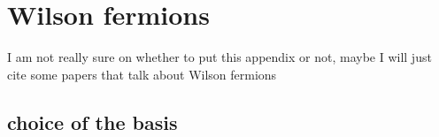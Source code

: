 \chapter{Wilson fermions}
\label{chap:AppendixB}
I am not really sure on whether to put this appendix or not, maybe I will just cite some papers that talk about Wilson fermions
\section*{choice of the basis}